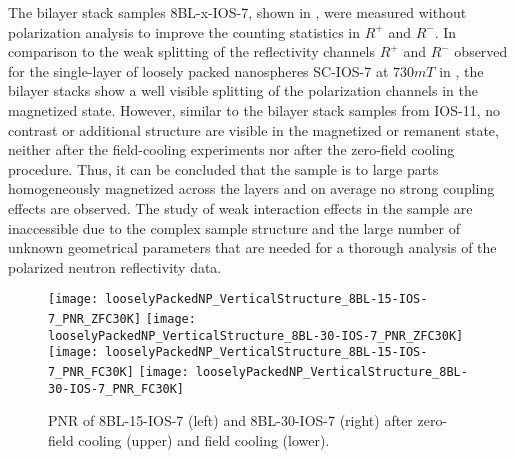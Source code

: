 \documentclass[\main/dresen_thesis.tex]{subfiles}
\begin{document}
  The bilayer stack samples 8BL-x-IOS-7, shown in , were measured without polarization analysis to improve the counting statistics in $R^{+}$ and $R^{-}$.
  In comparison to the weak splitting of the reflectivity channels $R^{+}$ and $R^{-}$ observed for the single-layer of loosely packed nanospheres SC-IOS-7 at $730 \unit{mT}$ in , the bilayer stacks show a well visible splitting of the polarization channels in the magnetized state.
  However, similar to the bilayer stack samples from IOS-11, no contrast or additional structure are visible in the magnetized or remanent state, neither after the field-cooling experiments nor after the zero-field cooling procedure.
  Thus, it can be concluded that the sample is to large parts homogeneously magnetized across the layers and on average no strong coupling effects are observed.
  The study of weak interaction effects in the sample are inaccessible due to the complex sample structure and the large number of unknown geometrical parameters that are needed for a thorough analysis of the polarized neutron reflectivity data.

  \begin{figure}[tb]
    \centering
    \texttt{[image: looselyPackedNP\_VerticalStructure\_8BL-15-IOS-7\_PNR\_ZFC30K]}
    \texttt{[image: looselyPackedNP\_VerticalStructure\_8BL-30-IOS-7\_PNR\_ZFC30K]}
    \texttt{[image: looselyPackedNP\_VerticalStructure\_8BL-15-IOS-7\_PNR\_FC30K]}
    \texttt{[image: looselyPackedNP\_VerticalStructure\_8BL-30-IOS-7\_PNR\_FC30K]}
    \caption{\label{fig:looselyPackedNP:bilayer:pnr:8BL-x-IOS7}PNR of 8BL-15-IOS-7 (left) and 8BL-30-IOS-7 (right) after zero-field cooling (upper) and field cooling (lower).}
  \end{figure}
\end{document}
